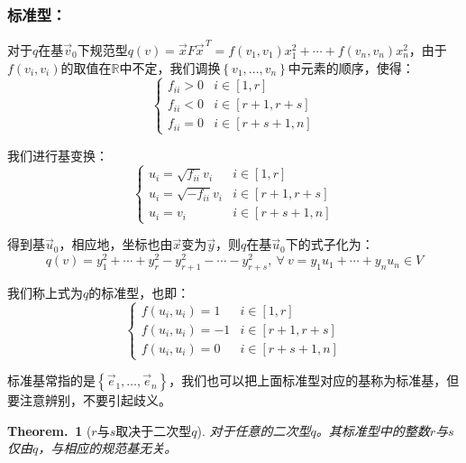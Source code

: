 \documentclass[zihao=-4,UTF8]{report}
\theoremstyle{mystyle} %
\newtheorem{theorem}{Theorem.\,}
\begin{document}
\subsubsection{标准型：}
对于$q$在基$\vec{v}_0$下规范型$q(v) = \vec{x}
F \vec{x}^{\,T}
  =f(v_1,v_1)x_1^2 + \cdots +f(v_n,v_n)x_n^2 $，由于$f(v_i,v_i)$的取值在$\mathbb{R}$中不定，我们调换$\left\{v_1,...,v_n\right\}$中元素的顺序，使得：
\begin{equation*}
    \begin{cases}
       f_{ii}>0 &  i \in [1,r] \\
       f_{ii}<0 &  i \in [r+1,r+s]\\
       f_{ii}=0 &  i \in [r+s+1,n]
      \end{cases}
\end{equation*}\par
我们进行基变换：
\begin{equation*}
    \begin{cases}
        u_i = \sqrt{f_{ii}}v_i &  i \in [1,r] \\
        u_i = \sqrt{-f_{ii}}v_i &  i \in [r+1,r+s]\\
        u_i = v_i &  i \in [r+s+1,n]
       \end{cases}
\end{equation*}\par
得到基$\vec{u}_0$，相应地，坐标也由$\vec{x}$变为$\vec{y}$，则$q$在基$\vec{u}_0$下的式子化为：
\begin{equation*}
    q(v) = y_1^2 + \cdots + y_r^2-y_{r+1}^2- \cdots -y_{r+s}^2 ,\ \forall \ v = y_1u_1 + \cdots + y_nu_n \in V
\end{equation*}\par
我们称上式为$q$的标准型，也即：
\begin{equation*}
    \begin{cases}
        f(u_i,u_i) = 1 &  i \in [1,r] \\
        f(u_i,u_i) = -1 &  i \in [r+1,r+s]\\
        f(u_i,u_i) = 0 &  i \in [r+s+1,n]
    \end{cases}
\end{equation*}\par
{\color{gray}\small 标准基常指的是$\left\{\vec{e}_1,\dots , \vec{e}_n\right\}$，我们也可以把上面标准型对应的基称为标准基，但要注意辨别，不要引起歧义。}
\begin{theorem}[$r$与$s$取决于二次型$q$]
    对于任意的二次型$q$。其标准型中的整数$r$与$s$仅由$q$，与相应的规范基无关。
\end{theorem}
\end{document}
